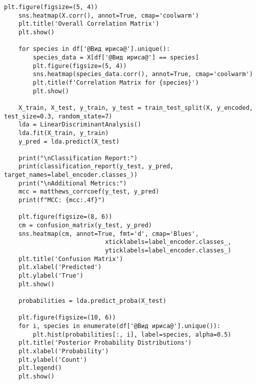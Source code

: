 \begin{lstlisting}[label=lst:1,caption=Классификация <<Ирисов Фишера>> с использованием байесовского подхода]
	plt.figure(figsize=(5, 4))
	sns.heatmap(X.corr(), annot=True, cmap='coolwarm')
	plt.title('Overall Correlation Matrix')
	plt.show()
	
	for species in df['@Вид ириса@'].unique():
		species_data = X[df['@Вид ириса@'] == species]
		plt.figure(figsize=(5, 4))
		sns.heatmap(species_data.corr(), annot=True, cmap='coolwarm')
		plt.title(f'Correlation Matrix for {species}')
		plt.show()
	
	X_train, X_test, y_train, y_test = train_test_split(X, y_encoded, test_size=0.3, random_state=7)
	lda = LinearDiscriminantAnalysis()
	lda.fit(X_train, y_train)
	y_pred = lda.predict(X_test)
	
	print("\nClassification Report:")
	print(classification_report(y_test, y_pred, target_names=label_encoder.classes_))
	print("\nAdditional Metrics:")
	mcc = matthews_corrcoef(y_test, y_pred)
	print(f"MCC: {mcc:.4f}")
	
	plt.figure(figsize=(8, 6))
	cm = confusion_matrix(y_test, y_pred)
	sns.heatmap(cm, annot=True, fmt='d', cmap='Blues',
							xticklabels=label_encoder.classes_,
							yticklabels=label_encoder.classes_)
	plt.title('Confusion Matrix')
	plt.xlabel('Predicted')
	plt.ylabel('True')
	plt.show()
	
	probabilities = lda.predict_proba(X_test)
	
	plt.figure(figsize=(10, 6))
	for i, species in enumerate(df['@Вид ириса@'].unique()):
		plt.hist(probabilities[:, i], label=species, alpha=0.5)
	plt.title('Posterior Probability Distributions')
	plt.xlabel('Probability')
	plt.ylabel('Count')
	plt.legend()
	plt.show()
\end{lstlisting}

\clearpage
